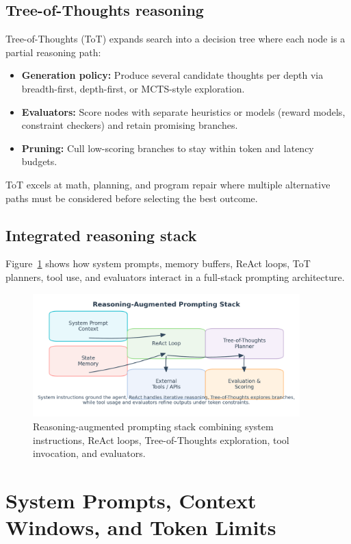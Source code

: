 \documentclass{article}
\begin{document}
\subsection{Tree-of-Thoughts reasoning}
Tree-of-Thoughts (ToT) expands search into a decision tree where each node is a partial reasoning path:
\begin{itemize}
  \item \textbf{Generation policy:} Produce several candidate thoughts per depth via breadth-first, depth-first, or MCTS-style exploration.
  \item \textbf{Evaluators:} Score nodes with separate heuristics or models (reward models, constraint checkers) and retain promising branches.
  \item \textbf{Pruning:} Cull low-scoring branches to stay within token and latency budgets.
\end{itemize}
ToT excels at math, planning, and program repair where multiple alternative paths must be considered before selecting the best outcome.

\subsection{Integrated reasoning stack}
Figure~\ref{fig:reasoning_stack_en} shows how system prompts, memory buffers, ReAct loops, ToT planners, tool use, and evaluators interact in a full-stack prompting architecture.
\begin{figure}[H]
  \centering
  \includegraphics[width=0.92\textwidth]{reasoning_stacks.png}
  \caption{Reasoning-augmented prompting stack combining system instructions, ReAct loops, Tree-of-Thoughts exploration, tool invocation, and evaluators.}
  \label{fig:reasoning_stack_en}
\end{figure}

\section{System Prompts, Context Windows, and Token Limits}
\end{document}
